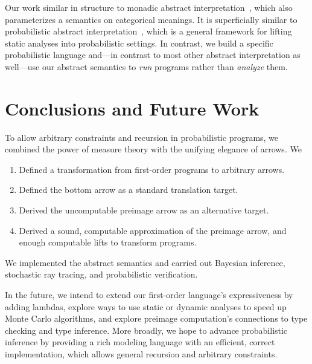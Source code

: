 \documentclass{llncs}
\begin{document}
Our work similar in structure to monadic abstract interpretation~\cite{cit:sergey-2013pldi-monadic-abstract}, which also parameterizes a semantics on categorical meanings.
It is superficially similar to probabilistic abstract interpretation~\cite{cit:cousot-2012esop-prob}, which is a general framework for lifting static analyses into probabilistic settings.
In contrast, we build a specific probabilistic language and---in contrast to most other abstract interpretation as well---use our abstract semantics to \emph{run} programs rather than \emph{analyze} them.


\section{Conclusions and Future Work}

To allow arbitrary constraints and recursion in probabilistic programs, we combined the power of measure theory with the unifying elegance of arrows. We
\begin{enumerate}
	\item Defined a transformation from first-order programs to arbitrary arrows.
	\item Defined the bottom arrow as a standard translation target.
	\item Derived the uncomputable preimage arrow as an alternative target.
	\item Derived a sound, computable approximation of the preimage arrow, and enough computable lifts to transform programs.
\end{enumerate}
We implemented the abstract semantics and carried out Bayesian inference, stochastic ray tracing, and probabilistic verification.

In the future, we intend to extend our first-order language's expressiveness by adding lambdas, explore ways to use static or dynamic analyses to speed up Monte Carlo algorithms, and explore preimage computation's connections to type checking and type inference.
More broadly, we hope to advance probabilistic inference by providing a rich modeling language with an efficient, correct implementation, which allows general recursion and arbitrary constraints.
\end{document}

